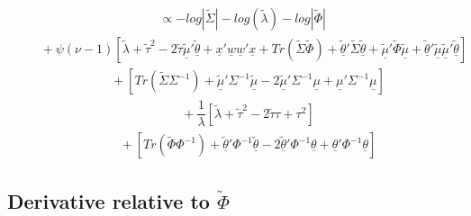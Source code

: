 \documentclass[fleqn]{minimal}
\begin{document}
\begin{align*}
  \ \ \ \ \ \
  \propto
  - log \left| \tilde{\Sigma} \right|
  - log \left(
    \tilde{\lambda}
  \right)
  - log \left| \tilde{\Phi} \right|
\end{align*}
\begin{align*}
  \ \ \ \ \ \ \ \ \ \
  + \psi\left(\nu-1\right)
  \left[
    \tilde{\lambda} + \tilde{\tau}^2
    - 2\tilde{\tau}\underline{\tilde{\mu}}'\underline{\tilde{\theta}}
    + \underline{x}'\underline{w}\underline{w}'\underline{x}
    + Tr \left( \tilde{\Sigma}\tilde{\Phi}\right)
    + \underline{\tilde{\theta}}'\tilde{\Sigma}\underline{\tilde{\theta}}
    + \underline{\tilde{\mu}}'\tilde{\Phi}\underline{\tilde{\mu}}
    + \underline{\tilde{\theta}}'\underline{\tilde{\mu}}\underline{\tilde{\mu}}'\underline{\tilde{\theta}}
  \right]
\end{align*}
\begin{align*}
  \ \ \ \ \ \ \ \ \ \
  + \left[
    Tr \left( \tilde{\Sigma}\Sigma^{-1}\right)
    + \underline{\tilde{\mu}}'\Sigma^{-1}\underline{\tilde{\mu}}
    -2 \underline{\tilde{\mu}}'\Sigma^{-1}\underline{\mu}
    + \underline{\mu}'\Sigma^{-1}\underline{\mu}
  \right]
\end{align*}
\begin{align*}
  \ \ \ \ \ \ \ \ \ \
  + \dfrac{1}{\lambda}
  \left[
    \tilde{\lambda} + \tilde{\tau}^2 - 2\tilde{\tau}\tau + \tau^2
  \right]
\end{align*}
\begin{align*}
  \ \ \ \ \ \ \ \ \ \
  + \left[
    Tr\left(\tilde{\Phi} \Phi^{-1}\right)
    + \underline{\tilde{\theta}}'\Phi^{-1}\underline{\tilde{\theta}}
    -2 \underline{\tilde{\theta}}' \Phi^{-1}\underline{\theta}
    + \underline{\theta}' \Phi^{-1}\underline{\theta}
  \right]
\end{align*}

\subsection{Derivative relative to $\tilde{\Phi}$}
\end{document}
